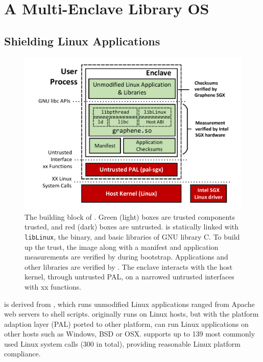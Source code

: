 \section{A Multi-Enclave Library OS}

\subsection{Shielding Linux Applications}
\label{sec:background:graphene}

\begin{figure}[t!]
\centering
\includegraphics[width=4.5in]{graphene-sgx/figures/architecture.pdf}
\vspace{-0.1in}
\footnotesize
\caption[The building block of \sysname{}]
{The building block of \sysname{}.
Green (light) boxes are trusted components trusted,
and red (dark) boxes are untrusted.
\sysname{} is statically linked with {\tt libLinux},
the \libos{} binary, and basic libraries of GNU library C.
To build up the trust, the \sysname{} image along with
a manifest and application measurements
are verified by \sgx{} during bootstrap. Applications and other libraries
are verified by \sysname{}. The enclave interacts with the host kernel,
through untrusted PAL, on a narrowed untrusted interfaces with xx functions.
}
\label{fig:arch}
\end{figure}

\sysname{} is derived from \graphene{} \libos{}, which runs unmodified
Linux applications ranged from Apache web servers to shell scripts.
\graphene{} \libos{} originally runs on Linux hosts, but with the platform
adaption layer (PAL) ported to other platform,
\graphene{} can run Linux applications on other hosts such as
Windows, BSD or OSX.
\graphene{} supports up to 139 most commonly used Linux system calls
(300 in total),
providing reasonable Linux platform compliance.

